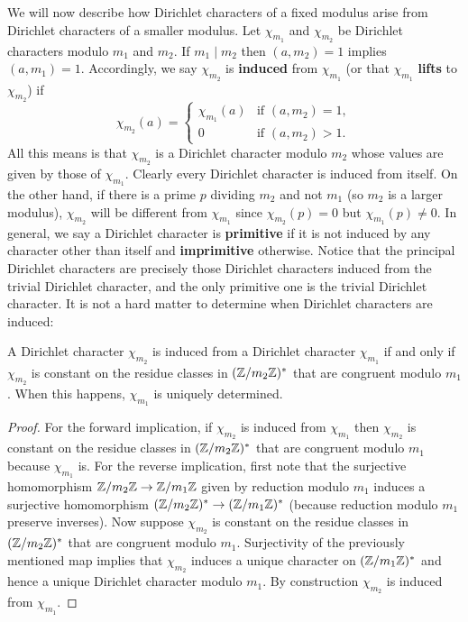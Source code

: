     We will now describe how Dirichlet characters of a fixed modulus arise from Dirichlet characters of a smaller modulus. Let $\chi_{m_{1}}$ and $\chi_{m_{2}}$ be Dirichlet characters modulo $m_{1}$ and $m_{2}$. If $m_{1} \mid m_{2}$ then $(a,m_{2}) = 1$ implies $(a,m_{1}) = 1$. Accordingly, we say $\chi_{m_{2}}$ is \textbf{induced} from $\chi_{m_{1}}$ (or that $\chi_{m_{1}}$ \textbf{lifts} to $\chi_{m_{2}}$) if
    \[
      \chi_{m_{2}}(a) = \begin{cases} \chi_{m_{1}}(a) & \text{if $(a,m_{2}) = 1$}, \\ 0 & \text{if $(a,m_{2}) > 1$}. \end{cases}
    \]
    All this means is that $\chi_{m_{2}}$ is a Dirichlet character modulo $m_{2}$ whose values are given by those of $\chi_{m_{1}}$. Clearly every Dirichlet character is induced from itself. On the other hand, if there is a prime $p$ dividing $m_{2}$ and not $m_{1}$ (so $m_{2}$ is a larger modulus), $\chi_{m_{2}}$ will be different from $\chi_{m_{1}}$ since $\chi_{m_{2}}(p) = 0$ but $\chi_{m_{1}}(p) \neq 0$. In general, we say a Dirichlet character is \textbf{primitive} if it is not induced by any character other than itself and \textbf{imprimitive} otherwise. Notice that the principal Dirichlet characters are precisely those Dirichlet characters induced from the trivial Dirichlet character, and the only primitive one is the trivial Dirichlet character. It is not a hard matter to determine when Dirichlet characters are induced:

    \begin{proposition}\label{prop:Dirichlet_character_induction_classification}
      A Dirichlet character $\chi_{m_{2}}$ is induced from a Dirichlet character $\chi_{m_{1}}$ if and only if $\chi_{m_{2}}$ is constant on the residue classes in $(\mathbb{Z}/m_{2}\mathbb{Z})^{\ast}$ that are congruent modulo $m_{1}$. When this happens, $\chi_{m_{1}}$ is uniquely determined.
    \end{proposition}
    \begin{proof}
      For the forward implication, if $\chi_{m_{2}}$ is induced from $\chi_{m_{1}}$ then $\chi_{m_{2}}$ is constant on the residue classes in $(\mathbb{Z}/m_{2}\mathbb{Z})^{\ast}$ that are congruent modulo $m_{1}$ because $\chi_{m_{1}}$ is. For the reverse implication, first note that the surjective homomorphism $\mathbb{Z}/m_{2}\mathbb{Z} \to \mathbb{Z}/m_{1}\mathbb{Z}$ given by reduction modulo $m_{1}$ induces a surjective homomorphism $(\mathbb{Z}/m_{2}\mathbb{Z})^{\ast} \to (\mathbb{Z}/m_{1}\mathbb{Z})^{\ast}$ (because reduction modulo $m_{1}$ preserve inverses). Now suppose $\chi_{m_{2}}$ is constant on the residue classes in $(\mathbb{Z}/m_{2}\mathbb{Z})^{\ast}$ that are congruent modulo $m_{1}$. Surjectivity of the previously mentioned map implies that $\chi_{m_{2}}$ induces a unique character on $(\mathbb{Z}/m_{1}\mathbb{Z})^{\ast}$ and hence a unique Dirichlet character modulo $m_{1}$. By construction $\chi_{m_{2}}$ is induced from $\chi_{m_{1}}$.
    \end{proof}

